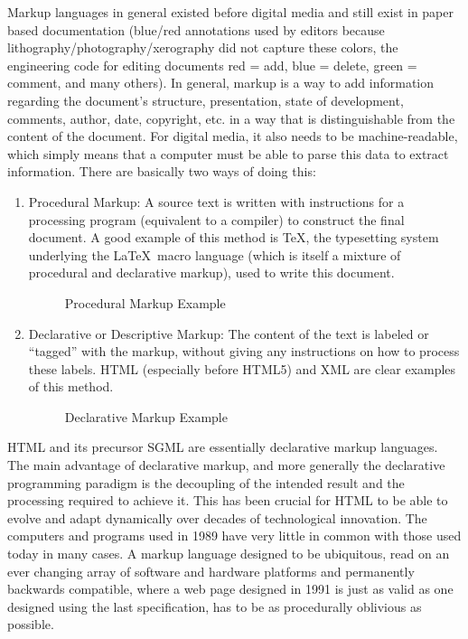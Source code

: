 Markup languages in general existed before digital media and still exist in paper based documentation (blue/red
annotations used by editors because lithography/photography/xerography did not capture these colors, the engineering
code for editing documents red = add, blue = delete, green = comment, and many others). In general, markup is a way to
add information regarding the document's structure, presentation, state of development, comments, author, date,
copyright, etc. in a way that is distinguishable from the content of the document. For digital media, it also needs to
be machine-readable, which simply means that a computer must be able to parse this data to extract information. There
are basically two ways of doing this:
\begin{enumerate}
	\item Procedural Markup: A source text is written with instructions for a processing program (equivalent to a
  compiler) to construct the final document. A good example of this method is \TeX, the typesetting system underlying
  the \LaTeX\ macro language (which is itself a mixture of procedural and declarative markup), used to write this
  document.
	\begin{figure}[ht]
    \caption{Procedural Markup Example}
	\end{figure}
	\item Declarative or Descriptive Markup: The content of the text is labeled or ``tagged'' with the markup, without
  giving any instructions on how to process these labels. HTML (especially before HTML5) and XML are clear examples of
  this method.
	\begin{figure}[ht]
    \caption{Declarative Markup Example}
	\end{figure}
\end{enumerate}
HTML and its precursor SGML are essentially declarative markup languages. The main advantage of declarative markup,
and more generally the declarative programming paradigm is the decoupling of the intended result and the processing
required to achieve it. This has been crucial for HTML to be able to evolve and adapt dynamically over decades of
technological innovation. The computers and programs used in 1989 have very little in common with those used today in
many cases. A markup language designed to be ubiquitous, read on an ever changing array of software and hardware
platforms and permanently backwards compatible, where a web page designed in 1991 is just as valid as one designed
using the last specification, has to be as procedurally oblivious as possible.\\


